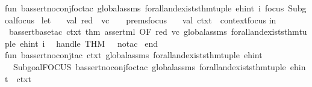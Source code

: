 \begin{isabellebody}
\isanewline
fun\ b{\isacharunderscore}{\kern0pt}assert{\isacharunderscore}{\kern0pt}no{\isacharunderscore}{\kern0pt}conj{\isacharunderscore}{\kern0pt}foc{\isacharunderscore}{\kern0pt}tac\ global{\isacharunderscore}{\kern0pt}assms\ forall{\isacharunderscore}{\kern0pt}and{\isacharunderscore}{\kern0pt}exists{\isacharunderscore}{\kern0pt}thm{\isacharunderscore}{\kern0pt}tuple\ ehint\ i\ {\isacharparenleft}{\kern0pt}focus{\isacharcolon}{\kern0pt}\ Subgoal{\isachardot}{\kern0pt}focus{\isacharparenright}{\kern0pt}\ {\isacharequal}{\kern0pt}\isanewline
let\ \isanewline
\ \ val\ {\isacharparenleft}{\kern0pt}red\ {\isacharcolon}{\kern0pt}{\isacharcolon}{\kern0pt}\ vc\ {\isacharcolon}{\kern0pt}{\isacharcolon}{\kern0pt}\ {\isacharunderscore}{\kern0pt}{\isacharparenright}{\kern0pt}\ {\isacharequal}{\kern0pt}\ {\isacharhash}{\kern0pt}prems{\isacharparenleft}{\kern0pt}focus{\isacharparenright}{\kern0pt}\ \isanewline
\ \ val\ ctxt\ {\isacharequal}{\kern0pt}\ {\isacharhash}{\kern0pt}context{\isacharparenleft}{\kern0pt}focus{\isacharparenright}{\kern0pt}\isanewline
in\isanewline
\ {\isacharparenleft}{\kern0pt}b{\isacharunderscore}{\kern0pt}assert{\isacharunderscore}{\kern0pt}base{\isacharunderscore}{\kern0pt}tac\ ctxt\ {\isacharparenleft}{\kern0pt}{\isacharat}{\kern0pt}{\isacharbraceleft}{\kern0pt}thm\ assert{\isacharunderscore}{\kern0pt}ml{\isacharbraceright}{\kern0pt}\ OF\ {\isacharbrackleft}{\kern0pt}red{\isacharbrackright}{\kern0pt}{\isacharparenright}{\kern0pt}\ vc\ global{\isacharunderscore}{\kern0pt}assms\ forall{\isacharunderscore}{\kern0pt}and{\isacharunderscore}{\kern0pt}exists{\isacharunderscore}{\kern0pt}thm{\isacharunderscore}{\kern0pt}tuple\ ehint\ i{\isacharparenright}{\kern0pt}\isanewline
\ \ handle\ THM\ {\isacharunderscore}{\kern0pt}\ {\isacharequal}{\kern0pt}{\isachargreater}{\kern0pt}\ no{\isacharunderscore}{\kern0pt}tac\ \isanewline
end\isanewline
\isanewline
fun\ b{\isacharunderscore}{\kern0pt}assert{\isacharunderscore}{\kern0pt}no{\isacharunderscore}{\kern0pt}conj{\isacharunderscore}{\kern0pt}tac\ ctxt\ global{\isacharunderscore}{\kern0pt}assms\ forall{\isacharunderscore}{\kern0pt}and{\isacharunderscore}{\kern0pt}exists{\isacharunderscore}{\kern0pt}thm{\isacharunderscore}{\kern0pt}tuple\ ehint\ {\isacharequal}{\kern0pt}\isanewline
\ \ {\isacharparenleft}{\kern0pt}Subgoal{\isachardot}{\kern0pt}FOCUS\ {\isacharparenleft}{\kern0pt}b{\isacharunderscore}{\kern0pt}assert{\isacharunderscore}{\kern0pt}no{\isacharunderscore}{\kern0pt}conj{\isacharunderscore}{\kern0pt}foc{\isacharunderscore}{\kern0pt}tac\ global{\isacharunderscore}{\kern0pt}assms\ forall{\isacharunderscore}{\kern0pt}and{\isacharunderscore}{\kern0pt}exists{\isacharunderscore}{\kern0pt}thm{\isacharunderscore}{\kern0pt}tuple\ ehint\ {}{\isacharparenright}{\kern0pt}\ ctxt\ {}{\isacharparenright}{\kern0pt}\isanewline

\end{isabellebody}
